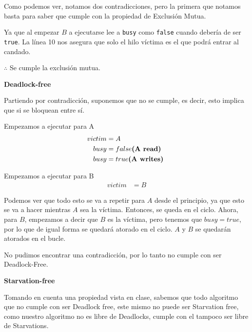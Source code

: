 \begin{enumerate}
    Como podemos ver, notamos dos contradicciones, pero la primera que notamos basta para saber que cumple con la propiedad de Exclusión Mutua.

    Ya que al empezar $B$ a ejecutarse lee a \texttt{busy} como \texttt{false} cuando debería de ser \texttt{true}. La línea 10 nos asegura que solo el hilo víctima es el que podrá entrar al candado.

    $\therefore$ Se cumple la exclusión mutua.

    \hfill

    \textbf{Deadlock-free}

    Partiendo por contradicción, suponemos que no se cumple, es decir, esto implica que si se bloquean entre sí.

    Empezamos a ejecutar para A\\
    \begin{equation}
    \setcounter{equation}{1}
        \begin{split}
         victim &= A\\
        busy &= false \textbf{(A read)}\\
         busy &= true \textbf{(A writes) }\\
    \end{split}
    \end{equation}
    
    Empezamos a ejecutar para B\\
    \begin{equation}
        \begin{split}
         victim &= B
    \end{split}
    \end{equation}
    
    Podemos ver que todo esto se va a repetir para $A$ desde el principio, ya que esto se va a hacer mientras $A$ sea la víctima. Entonces, se queda en el ciclo. Ahora, para $B$, empezamos a decir que $B$ es la víctima, pero tenemos que $busy = true$, por lo que de igual forma se quedará atorado en el ciclo. $A$ y $B$ se quedarán atorados en el bucle.
    
    No pudimos encontrar una contradicción, por lo tanto no cumple con ser Deadlock-Free.

    \hfill
    
    \textbf {Starvation-free}
    
    Tomando en cuenta una propiedad vista en clase, sabemos que todo algoritmo que no cumple con ser Deadlock free, este mismo no puede ser Starvation free, como nuestro algoritmo no es libre de Deadlocks, cumple con el tampoco ser libre de Starvations. 
    

\end{enumerate}
